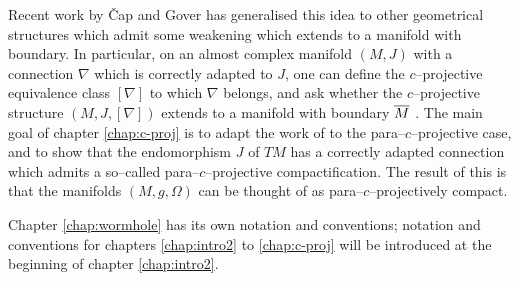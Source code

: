 Recent work by \v Cap and Gover \cite{CG0,CG} has generalised this idea to other geometrical structures which admit some weakening which extends to a manifold with boundary. In particular, on an almost complex manifold $(M,J)$ with a connection $\nabla$ which is correctly adapted to $J$, one can define the $c$--projective equivalence class $[\nabla]$ to which $\nabla$ belongs, and ask whether the $c$--projective structure $(M,J,[\nabla])$ extends to a manifold with boundary $\overline{M}$ \cite{CG}. The main goal of chapter \ref{chap:c-proj} is to adapt the work of \cite{CG} to the para--$c$--projective case, and to show that the endomorphism $J$ of $TM$ has a correctly adapted connection which admits a so--called para--$c$--projective compactification. The result of this is that the manifolds $(M,g,\Omega)$ can be thought of as para--$c$--projectively compact.

Chapter \ref{chap:wormhole} has its own notation and conventions; notation and conventions for chapters \ref{chap:intro2} to \ref{chap:c-proj} will be introduced at the beginning of chapter \ref{chap:intro2}.






